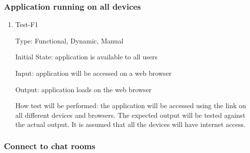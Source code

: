\documentclass[12pt, titlepage]{article}
\begin{document}
\subsubsection{Application running on all devices}
		

\begin{enumerate}

\item{Test-F1\\}

Type: Functional, Dynamic, Manual
					
Initial State: application is available to all users
					
Input: application will be accessed on a web browser
					
Output: application loads on the web browser
					
How test will be performed: the application will be accessed using the link on all different devices and browsers. The expected output will be tested against the actual output. It is assumed that all the devices will have internet access. 
					
\end{enumerate}

\subsubsection{Connect to chat rooms}
		
\end{document}
